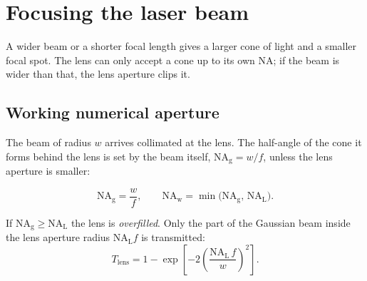 \documentclass[12pt,a4paper]{article}
\begin{document}
\section{Focusing the laser beam}
\label{sec:focus}

\begin{short}
A wider beam or a shorter focal length gives a larger cone of light and a smaller focal spot.
The lens can only accept a cone up to its own NA; if the beam is wider than that, the lens
aperture clips it.
\end{short}

\subsection{Working numerical aperture}
The beam of radius $w$ arrives collimated at the lens. The half-angle of the cone it forms behind the lens is set by the beam itself, $\mathrm{NA_g}=w/f$, unless the lens aperture is smaller:
\begin{keyeq}
\begin{equation}
\mathrm{NA_g}=\frac{w}{f},\qquad
\mathrm{NA_w}=\min\big(\mathrm{NA_g},\,\mathrm{NA_L}\big).
\label{eq:na}
\end{equation}
\end{keyeq}
If $\mathrm{NA_g}\ge\mathrm{NA_L}$ the lens is \emph{overfilled}. Only the part of the Gaussian beam inside the lens aperture radius $\mathrm{NA_L}f$ is transmitted:
\begin{equation}
T_\mathrm{lens}=1-\exp\!\left[-2\left(\frac{\mathrm{NA_L}\,f}{w}\right)^{2}\right].
\end{equation}
\end{document}

